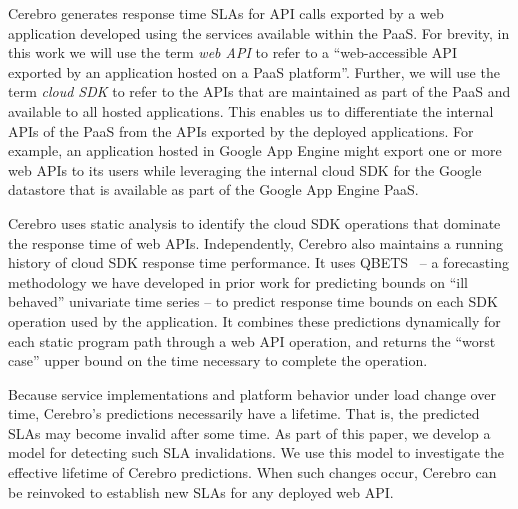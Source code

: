 Cerebro generates response time SLAs for API calls exported by a web
application
developed using the services available within the PaaS.  For brevity, in this work
we will use the
term \textit{web API} to refer to a ``web-accessible API exported by an
application hosted on a PaaS platform''. Further, 
we will use the term \textit{cloud
SDK} to refer to the APIs that are maintained as part of the PaaS and
available to all hosted applications. This enables us to
differentiate the internal APIs of the PaaS from the 
APIs exported by the deployed applications.   
For example, an application hosted in Google App Engine might export one or
more web APIs to its users while leveraging the internal cloud SDK for the
Google datastore that is available as part of the Google App Engine PaaS.

Cerebro uses static analysis to identify the cloud SDK operations
that dominate the response time of web APIs.  Independently,
Cerebro also maintains a running history of cloud SDK response time 
performance.  It uses
QBETS~\cite{Nurmi:2007:QQB:1791551.1791556} -- a forecasting methodology
we have developed in prior work for predicting bounds on ``ill behaved''   
univariate time series -- to predict response time bounds on each SDK
operation used by the application.  It combines these predictions dynamically
for each static program path through a web API operation,
and returns the ``worst case''
upper bound on the time necessary to 
complete the operation.


Because service implementations and platform behavior under load change over time,
Cerebro's predictions necessarily have a lifetime. That is, the predicted SLAs may
become invalid after some time.  
As part of this paper, we develop a model for detecting such SLA invalidations. 
We use this model to investigate
the effective lifetime of Cerebro predictions. When such changes occur,
Cerebro can be reinvoked to establish new SLAs for any deployed web API.  %

